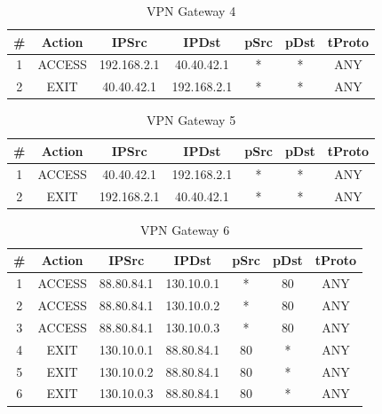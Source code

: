 \begin{table}[H]
    \centering
    \begin{tabular}{ccccccc}
        \hline
         \# & Action & IPSrc & IPDst & pSrc & pDst & tProto \\
        \hline
        1 & ACCESS & 192.168.2.1 & 40.40.42.1 & * & * & ANY \\
        2 & EXIT & 40.40.42.1 & 192.168.2.1 & * & * & ANY \\
        \hline
    \end{tabular}
    \caption{VPN Gateway 4}
    \label{tab:VPN Gateway 4}
\end{table}

\begin{table}[H]
    \centering
    \begin{tabular}{ccccccc}
        \hline
         \# & Action & IPSrc & IPDst & pSrc & pDst & tProto \\
        \hline
        1 & ACCESS & 40.40.42.1 & 192.168.2.1 & * & * & ANY \\
        2 & EXIT & 192.168.2.1 & 40.40.42.1 & * & * & ANY \\
        \hline
    \end{tabular}
    \caption{VPN Gateway 5}
    \label{tab:VPN Gateway 5}
\end{table}

\begin{table}[H]
    \centering
    \begin{tabular}{ccccccc}
        \hline
         \# & Action & IPSrc & IPDst & pSrc & pDst & tProto \\
        \hline
        1 & ACCESS & 88.80.84.1 & 130.10.0.1 & * & 80 & ANY \\
        2 & ACCESS & 88.80.84.1 & 130.10.0.2 & * & 80 & ANY \\
        3 & ACCESS & 88.80.84.1 & 130.10.0.3 & * & 80 & ANY \\
        4 & EXIT & 130.10.0.1 & 88.80.84.1 & 80 & * & ANY \\
        5 & EXIT & 130.10.0.2 & 88.80.84.1 & 80 & * & ANY \\
        6 & EXIT & 130.10.0.3 & 88.80.84.1 & 80 & * & ANY \\
        \hline
    \end{tabular}
    \caption{VPN Gateway 6}
    \label{tab:VPN Gateway 6}
\end{table}

